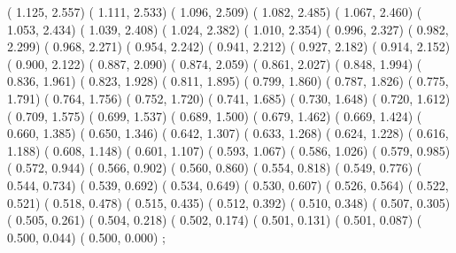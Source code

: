 {  (  1.125,   2.557)  (  1.111,   2.533)  (  1.096,   2.509)  (  1.082,   2.485)  (  1.067,   2.460)
  (  1.053,   2.434)  (  1.039,   2.408)  (  1.024,   2.382)  (  1.010,   2.354)  (  0.996,   2.327)
  (  0.982,   2.299)  (  0.968,   2.271)  (  0.954,   2.242)  (  0.941,   2.212)  (  0.927,   2.182)
  (  0.914,   2.152)  (  0.900,   2.122)  (  0.887,   2.090)  (  0.874,   2.059)  (  0.861,   2.027)
  (  0.848,   1.994)  (  0.836,   1.961)  (  0.823,   1.928)  (  0.811,   1.895)  (  0.799,   1.860)
  (  0.787,   1.826)  (  0.775,   1.791)  (  0.764,   1.756)  (  0.752,   1.720)  (  0.741,   1.685)
  (  0.730,   1.648)  (  0.720,   1.612)  (  0.709,   1.575)  (  0.699,   1.537)  (  0.689,   1.500)
  (  0.679,   1.462)  (  0.669,   1.424)  (  0.660,   1.385)  (  0.650,   1.346)  (  0.642,   1.307)
  (  0.633,   1.268)  (  0.624,   1.228)  (  0.616,   1.188)  (  0.608,   1.148)  (  0.601,   1.107)
  (  0.593,   1.067)  (  0.586,   1.026)  (  0.579,   0.985)  (  0.572,   0.944)  (  0.566,   0.902)
  (  0.560,   0.860)  (  0.554,   0.818)  (  0.549,   0.776)  (  0.544,   0.734)  (  0.539,   0.692)
  (  0.534,   0.649)  (  0.530,   0.607)  (  0.526,   0.564)  (  0.522,   0.521)  (  0.518,   0.478)
  (  0.515,   0.435)  (  0.512,   0.392)  (  0.510,   0.348)  (  0.507,   0.305)  (  0.505,   0.261)
  (  0.504,   0.218)  (  0.502,   0.174)  (  0.501,   0.131)  (  0.501,   0.087)  (  0.500,   0.044)
  (  0.500,   0.000)
};
